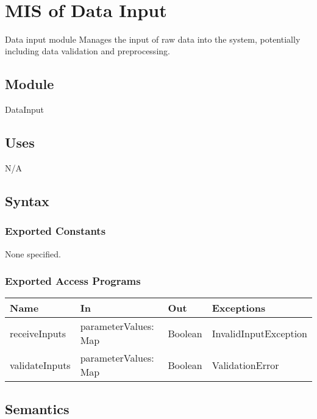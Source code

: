 \documentclass[12pt, titlepage]{article}
\begin{document}
\newpage
~\newpage

\section{MIS of Data Input} \label{mDI}

Data input module Manages the input of raw data into the system, potentially including data validation and preprocessing.

\subsection{Module}

DataInput

\subsection{Uses}
N/A

\subsection{Syntax}

\subsubsection{Exported Constants}
None specified.

\subsubsection{Exported Access Programs}

\begin{center}
\begin{tabular}{p{4cm} p{4cm} p{4cm} p{4cm}}
\hline
\textbf{Name} & \textbf{In} & \textbf{Out} & \textbf{Exceptions} \\
\hline
receiveInputs & parameterValues: Map & Boolean & InvalidInputException \\
validateInputs & parameterValues: Map & Boolean & ValidationError \\
\hline
\end{tabular}
\end{center}

\subsection{Semantics}
\end{document}
